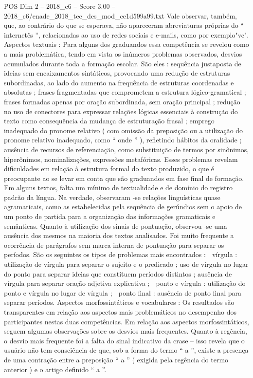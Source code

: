 \begin{textsample}{POS Dim 2 – 2018\_c6 – Score 3.00 – 2018\_c6/enade\_2018\_tec\_des\_mod\_ce1d599a99.txt}
Vale observar, também, que, ao contrário do que se esperava, não apareceram abreviaturas próprias do “ internetês ”, relacionadas ao uso de redes sociais e e-mails, como por exemplo"vc".
Aspectos textuais : Para alguns dos graduandos essa competência se revelou como a mais problemática, tendo em vista os inúmeros problemas observados, desvios acumulados durante toda a formação escolar.
São eles : sequência justaposta de ideias sem encaixamentos sintáticos, provocando uma redução de estruturas subordinadas, ao lado do aumento na frequência de estruturas coordenadas e absolutas ; frases fragmentadas que comprometem a estrutura lógico-gramatical ; frases formadas apenas por oração subordinada, sem oração principal ; redução no uso de conectores para expressar relações lógicas essenciais à construção do texto como consequência da mudança de estruturação frasal ; emprego inadequado do pronome relativo ( com omissão da preposição ou a utilização do pronome relativo inadequado, como “ onde ” ), refletindo hábitos da oralidade ; ausência de recursos de referenciação, como substituição de termos por sinônimos, hiperônimos, nominalizações, expressões metafóricas.
Esses problemas revelam dificuldades em relação à estrutura formal do texto produzido, o que é preocupante ao se levar em conta que são graduandos em fase final de formação.
Em alguns textos, falta um mínimo de textualidade e de domínio do registro padrão da língua.
Na verdade, observaram -se relações linguísticas quase agramaticais, como as estabelecidas pela sequência de gerúndios sem o apoio de um ponto de partida para a organização das informações gramaticais e semânticas.
Quanto à utilização dos sinais de pontuação, observou -se uma ausência dos mesmos na maioria dos textos analisados.
Foi muito frequente a ocorrência de parágrafos sem marca interna de pontuação para separar os períodos.
São os seguintes os tipos de problemas mais encontrados :  vírgula : utilização de vírgula para separar o sujeito e o predicado ; uso de vírgula no lugar do ponto para separar ideias que constituem períodos distintos ; ausência de vírgula para separar oração adjetiva explicativa ;  ponto e vírgula : utilização do ponto e vírgula no lugar de vírgula ;  ponto final : ausência de ponto final para separar períodos.
Aspectos morfossintáticos e vocabulares : Os resultados são transparentes em relação aos aspectos mais problemáticos no desempenho dos participantes nestas duas competências.
Em relação aos aspectos morfossintáticos, seguem algumas observações sobre os desvios mais frequentes.
Quanto à regência, o desvio mais frequente foi a falta do sinal indicativo da crase – isso revela que o usuário não tem consciência de que, sob a forma do termo “ a ”, existe a presença de uma contração entre a preposição “ a ” ( exigida pela regência do termo anterior ) e o artigo definido “ a ”.

\end{textsample}
